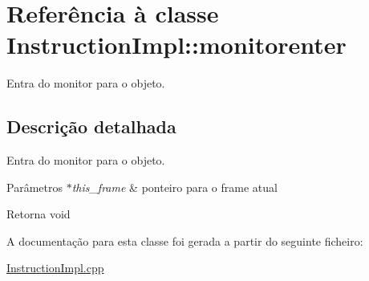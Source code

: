 \hypertarget{class_instruction_impl_1_1monitorenter}{}\section{Referência à classe Instruction\+Impl\+:\+:monitorenter}
\label{class_instruction_impl_1_1monitorenter}


Entra do monitor para o objeto.  




\subsection{Descrição detalhada}
Entra do monitor para o objeto. 


\begin{DoxyParams}{Parâmetros}
{\em $\ast$this\+\_\+frame} & ponteiro para o frame atual \\
\hline
\end{DoxyParams}
\begin{DoxyReturn}{Retorna}
void 
\end{DoxyReturn}


A documentação para esta classe foi gerada a partir do seguinte ficheiro\+:\begin{DoxyCompactItemize}
\item 
\hyperlink{_instruction_impl_8cpp}{Instruction\+Impl.\+cpp}\end{DoxyCompactItemize}
